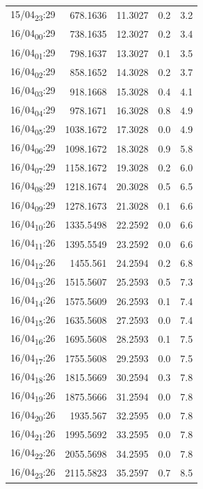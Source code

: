 \documentclass[11pt]{article}
\begin{document}
\begin{center}
\begin{tabular}{lrrrr}
15/04\textsubscript{23}:29 & 678.1636 & 11.3027 & 0.2 & 3.2\\[0pt]
16/04\textsubscript{00}:29 & 738.1635 & 12.3027 & 0.2 & 3.4\\[0pt]
16/04\textsubscript{01}:29 & 798.1637 & 13.3027 & 0.1 & 3.5\\[0pt]
16/04\textsubscript{02}:29 & 858.1652 & 14.3028 & 0.2 & 3.7\\[0pt]
16/04\textsubscript{03}:29 & 918.1668 & 15.3028 & 0.4 & 4.1\\[0pt]
16/04\textsubscript{04}:29 & 978.1671 & 16.3028 & 0.8 & 4.9\\[0pt]
16/04\textsubscript{05}:29 & 1038.1672 & 17.3028 & 0.0 & 4.9\\[0pt]
16/04\textsubscript{06}:29 & 1098.1672 & 18.3028 & 0.9 & 5.8\\[0pt]
16/04\textsubscript{07}:29 & 1158.1672 & 19.3028 & 0.2 & 6.0\\[0pt]
16/04\textsubscript{08}:29 & 1218.1674 & 20.3028 & 0.5 & 6.5\\[0pt]
16/04\textsubscript{09}:29 & 1278.1673 & 21.3028 & 0.1 & 6.6\\[0pt]
16/04\textsubscript{10}:26 & 1335.5498 & 22.2592 & 0.0 & 6.6\\[0pt]
16/04\textsubscript{11}:26 & 1395.5549 & 23.2592 & 0.0 & 6.6\\[0pt]
16/04\textsubscript{12}:26 & 1455.561 & 24.2594 & 0.2 & 6.8\\[0pt]
16/04\textsubscript{13}:26 & 1515.5607 & 25.2593 & 0.5 & 7.3\\[0pt]
16/04\textsubscript{14}:26 & 1575.5609 & 26.2593 & 0.1 & 7.4\\[0pt]
16/04\textsubscript{15}:26 & 1635.5608 & 27.2593 & 0.0 & 7.4\\[0pt]
16/04\textsubscript{16}:26 & 1695.5608 & 28.2593 & 0.1 & 7.5\\[0pt]
16/04\textsubscript{17}:26 & 1755.5608 & 29.2593 & 0.0 & 7.5\\[0pt]
16/04\textsubscript{18}:26 & 1815.5669 & 30.2594 & 0.3 & 7.8\\[0pt]
16/04\textsubscript{19}:26 & 1875.5666 & 31.2594 & 0.0 & 7.8\\[0pt]
16/04\textsubscript{20}:26 & 1935.567 & 32.2595 & 0.0 & 7.8\\[0pt]
16/04\textsubscript{21}:26 & 1995.5692 & 33.2595 & 0.0 & 7.8\\[0pt]
16/04\textsubscript{22}:26 & 2055.5698 & 34.2595 & 0.0 & 7.8\\[0pt]
16/04\textsubscript{23}:26 & 2115.5823 & 35.2597 & 0.7 & 8.5\\[0pt]

\end{tabular}
\end{center}
\end{document}
